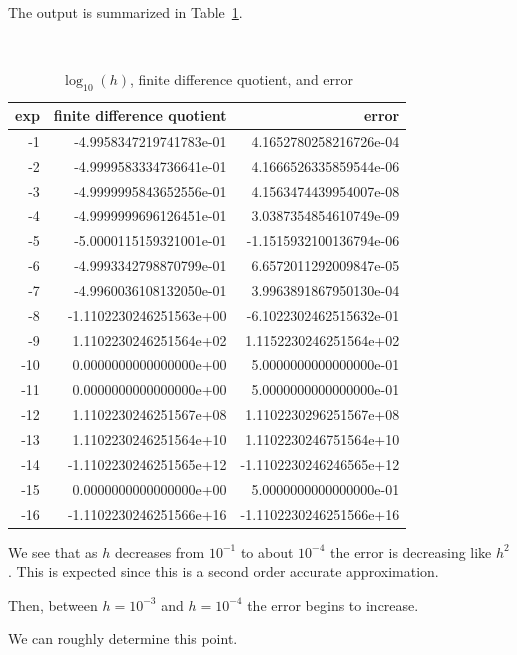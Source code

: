 \documentclass[10pt]{article}
\begin{document}
\begin{solution}[Solution]
The output is summarized in Table~\ref{fdq}.
\begin{table}[H]\centering\tt
\begin{tabular}{|r|r|r|} \hline
    {\rm exp} & {\rm finite difference quotient} & {\rm error} \\ \hline
  -1 &   -4.9958347219741783e-01 & 4.1652780258216726e-04 \\ 
  -2 &   -4.9999583334736641e-01 & 4.1666526335859544e-06 \\ 
  -3 &   -4.9999995843652556e-01 & 4.1563474439954007e-08 \\ 
  -4 &   -4.9999999696126451e-01 & 3.0387354854610749e-09 \\ 
  -5 &   -5.0000115159321001e-01 & -1.1515932100136794e-06 \\ 
  -6 &   -4.9993342798870799e-01 & 6.6572011292009847e-05 \\ 
  -7 &   -4.9960036108132050e-01 & 3.9963891867950130e-04 \\ 
  -8 &   -1.1102230246251563e+00 & -6.1022302462515632e-01 \\ 
  -9 &    1.1102230246251564e+02 & 1.1152230246251564e+02 \\ 
  -10 &    0.0000000000000000e+00 & 5.0000000000000000e-01 \\ 
  -11 &    0.0000000000000000e+00 & 5.0000000000000000e-01 \\ 
  -12 &    1.1102230246251567e+08 & 1.1102230296251567e+08 \\ 
  -13 &    1.1102230246251564e+10 & 1.1102230246751564e+10 \\ 
  -14 &   -1.1102230246251565e+12 & -1.1102230246246565e+12 \\ 
  -15 &    0.0000000000000000e+00 & 5.0000000000000000e-01 \\ 
  -16 &   -1.1102230246251566e+16 & -1.1102230246251566e+16 \\ \hline
\end{tabular}
    \caption{ \( \log_{10}(h) \), finite difference quotient, and error}
    \label{fdq}
\end{table}

We see that as \( h \) decreases from \( 10^{-1} \) to about \( 10^{-4} \) the error is decreasing like \( h^2 \). This is expected since this is a second order accurate approximation. 

Then, between \( h=10^{-3} \) and \( h=10^{-4} \) the error begins to increase.

We can roughly determine this point. 


\end{solution}
\end{document}
